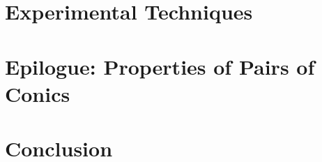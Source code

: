 \documentclass{book}
\begin{document}
\chapter{Experimental Techniques}
\label{chap:08-experimental}
%

\chapter{Epilogue: Properties of Pairs of Conics  }
\label{chap:09-conics}
 
%

\chapter{Conclusion}
\label{chap:10-conclusion}
%

%

%

\backmatter

\sloppy
\printbibliography


\end{document}
